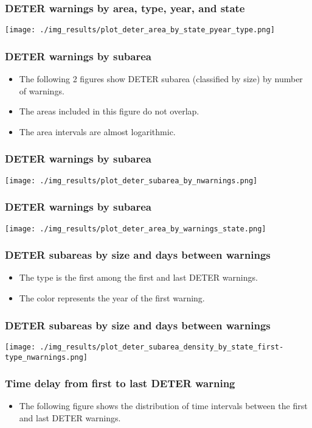 \documentclass{beamer}
\begin{document}
\begin{frame}
    \frametitle{DETER warnings by area, type, year, and state}
    \texttt{[image: ./img\_results/plot\_deter\_area\_by\_state\_pyear\_type.png]}
\end{frame}


\begin{frame}
    \frametitle{DETER warnings by subarea}
    \begin{itemize}
        \item The following 2 figures show DETER subarea (classified by size) 
            by number of warnings.
        \item The areas included in this figure do not overlap.
        \item The area intervals are almost logarithmic.
    \end{itemize}
\end{frame}

\begin{frame}
    \frametitle{DETER warnings by subarea}
    \texttt{[image: ./img\_results/plot\_deter\_subarea\_by\_nwarnings.png]}
\end{frame}

\begin{frame}
    \frametitle{DETER warnings by subarea}
    \texttt{[image: ./img\_results/plot\_deter\_area\_by\_warnings\_state.png]}
\end{frame}


\begin{frame}
    \frametitle{DETER subareas by size and days between warnings}
    \begin{itemize}
        \item The type is the first among the first and last DETER warnings.
        \item The color represents the year of the first warning.
    \end{itemize}
\end{frame}

\begin{frame}
    \frametitle{DETER subareas by size and days between warnings}
    \texttt{[image: ./img\_results/plot\_deter\_subarea\_density\_by\_state\_first-type\_nwarnings.png]}
\end{frame}


\begin{frame}
    \frametitle{Time delay from first to last DETER warning}
    \begin{itemize}
        \item The following figure shows the distribution of time intervals
            between the first and last DETER warnings.
    \end{itemize}
\end{frame}
\end{document}
